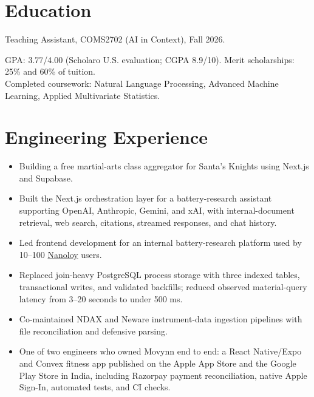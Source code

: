 

\section{Education}
Teaching Assistant, COMS2702 (AI in Context), Fall 2026.\par
\vspace{3pt}
GPA: 3.77/4.00 (Scholaro U.S. evaluation; CGPA 8.9/10). Merit scholarships: 25\% and 60\% of tuition.\\
Completed coursework: Natural Language Processing, Advanced Machine Learning, Applied Multivariate Statistics.
\section{Engineering Experience}
\begin{itemize}
  \item Building a free martial-arts class aggregator for Santa's Knights using Next.js and Supabase.
\end{itemize}
\begin{itemize}
  \item Built the Next.js orchestration layer for a battery-research assistant supporting OpenAI, Anthropic, Gemini, and xAI, with internal-document retrieval, web search, citations, streamed responses, and chat history.
  \item Led frontend development for an internal battery-research platform used by 10--100 \href{https://www.nanoloy.com}{Nanoloy} users.
  \item Replaced join-heavy PostgreSQL process storage with three indexed tables, transactional writes, and validated backfills; reduced observed material-query latency from 3--20 seconds to under 500 ms.
  \item Co-maintained NDAX and Neware instrument-data ingestion pipelines with file reconciliation and defensive parsing.
\end{itemize}
\begin{itemize}
  \item One of two engineers who owned Movynn end to end: a React Native/Expo and Convex fitness app published on the Apple App Store and the Google Play Store in India, including Razorpay payment reconciliation, native Apple Sign-In, automated tests, and CI checks.
\end{itemize}
